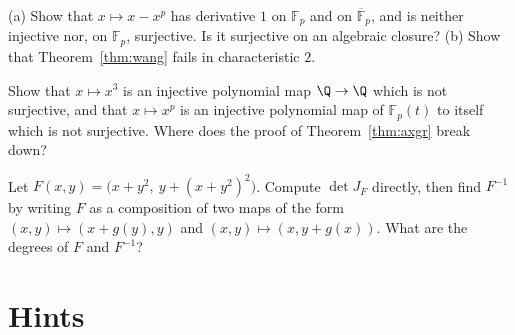 \begin{exercise}[$\star\star$]\label{ex:charpjac}
(a) Show that $x\mapsto x-x^p$ has derivative $1$ on $\mathbb F_p$ and on $\overline{\mathbb F}_p$, and is neither injective nor, on $\mathbb F_p$, surjective.
Is it surjective on an algebraic closure? (b) Show that Theorem~\ref{thm:wang} fails in characteristic $2$.
\end{exercise}

\begin{exercise}[$\star$]\label{ex:axfails}
Show that $x\mapsto x^3$ is an injective polynomial map $\Q\to\Q$ which is not surjective, and that $x\mapsto x^p$ is an injective polynomial map of
$\mathbb F_p(t)$ to itself which is not surjective. Where does the proof of Theorem~\ref{thm:axgr} break down?
\end{exercise}

\begin{exercise}[$\star\star$]\label{ex:triangular}
Let $F(x,y)=\bigl(x+y^2,\ y+(x+y^2)^2\bigr)$. Compute $\det J_F$ directly, then find $F^{-1}$ by writing $F$ as a composition of two maps of the form
$(x,y)\mapsto(x+g(y),y)$ and $(x,y)\mapsto(x,y+g(x))$. What are the degrees of $F$ and $F^{-1}$?
\end{exercise}

\section{Hints}

